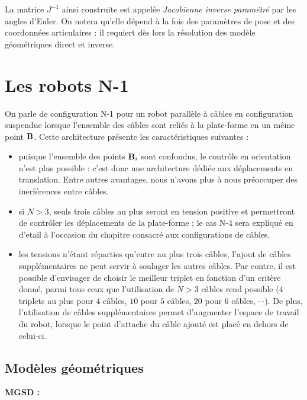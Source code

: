 La matrice $J^{-1}$ ainsi construite est appelée {\it Jacobienne 
inverse param\'etr\'e} par les angles d'Euler. On notera qu'elle dépend à la 
fois des paramètres de pose et des coordonnées articulaires : il requiert d\`es 
lors la r\'esolution des mod\`ele g\'eom\'etriques direct et inverse.

\section{Les robots N-1} \label{chap0-2}

On parle de configuration N-1 pour un robot parall\`ele \`a c\^ables en 
configuration suspendue lorsque l'ensemble des c\^ables sont reli\'es \`a la 
plate-forme en un m\^eme point ${\bf B}$. Cette architecture pr\'esente les 
caract\'eristiques suivantes :
\begin{itemize}
  \item puisque l'ensemble des points ${\bf B}_i$ sont confondus, le contr\^ole 
en orientation n'est plus possible : c'est donc une architecture d\'edi\'ee aux 
d\'eplacements en translation. Entre autres avantages, nous n'avons plus \`a 
nous pr\'eoccuper des inerf\'erences entre c\^ables.
  \item si $N > 3$, seuls trois c\^ables au plus seront en tension positive et 
permettront de contr\^oler les d\'eplacements de la plate-forme ; le cas N-4 
sera expliqu\'e en d'etail \`a l'occasion du chapitre consacr\'e aux 
configurations de c\^ables.
  \item les tensions n'\'etant r\'eparties qu'entre au plus trois c\^ables, 
l'ajout de c\^ables suppl\'ementaires ne peut servir \`a soulager les autres 
c\^ables. Par contre, il est possible d'envisager de choisir le meilleur 
triplet 
en fonction d'un crit\`ere donn\'e, parmi tous ceux que l'utilisation de $N>3$ 
c\^ables rend possible ($4$ triplets au plus pour $4$ c\^ables, $10$ pour $5$ 
c\^ables, $20$ pour $6$ c\^ables, $\cdots$). De plus, l'utilisation de c\^ables 
suppl\'ementaires permet d'augmenter l'espace de travail du robot, lorsque le 
point d'attache du c\^able ajout\'e est plac\'e en dehors de celui-ci.
\end{itemize}

\subsection{Mod\`eles g\'eom\'etriques}

{\bf MGSD :}\\

